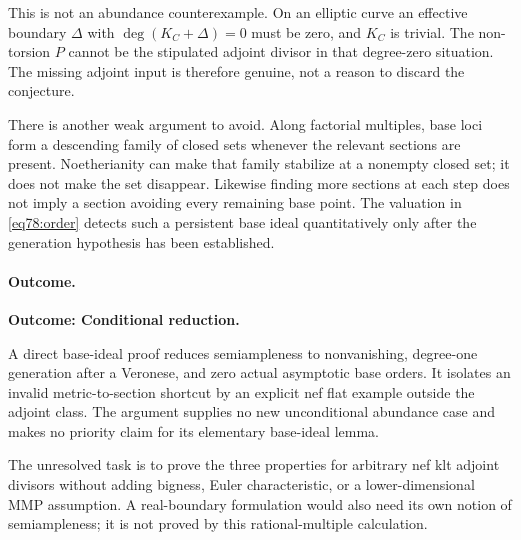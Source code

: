 \documentclass[11pt,a4paper]{article}
\numberwithin{equation}{section}
\begin{document}
This is not an abundance counterexample. On an elliptic curve an effective
boundary $\Delta$ with $\deg(K_C+\Delta)=0$ must be zero, and $K_C$ is
trivial. The non-torsion $P$ cannot be the stipulated adjoint divisor in
that degree-zero situation. The missing adjoint input is therefore genuine,
not a reason to discard the conjecture.

There is another weak argument to avoid. Along factorial multiples, base
loci form a descending family of closed sets whenever the relevant sections
are present. Noetherianity can make that family stabilize at a nonempty
closed set; it does not make the set disappear. Likewise finding more
sections at each step does not imply a section avoiding every remaining
base point. The valuation in \eqref{eq78:order} detects such a persistent
base ideal quantitatively only after the generation hypothesis has been
established.

\paragraph{Outcome.}
\textbf{Outcome: Conditional reduction.}

A direct base-ideal proof reduces semiampleness to nonvanishing,
degree-one generation after a Veronese, and zero actual asymptotic base
orders. It isolates an invalid metric-to-section shortcut by an explicit
nef flat example outside the adjoint class. The argument supplies no new
unconditional abundance case and makes no priority claim for its elementary
base-ideal lemma.

The unresolved task is to prove the three properties for arbitrary nef
klt adjoint divisors without adding bigness, Euler characteristic, or a
lower-dimensional MMP assumption. A real-boundary formulation would also
need its own notion of semiampleness; it is not proved by this
rational-multiple calculation.
\end{document}
